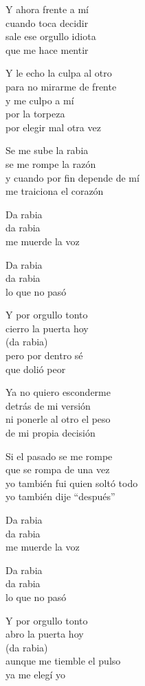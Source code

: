 \begin{lyrics}
Y ahora frente a mí\\
cuando toca decidir\\
sale ese orgullo idiota\\
que me hace mentir

Y le echo la culpa al otro\\
para no mirarme de frente\\
y me culpo a mí\\
por la torpeza\\
por elegir mal otra vez

Se me sube la rabia\\
se me rompe la razón\\
y cuando por fin depende de mí\\
me traiciona el corazón

Da rabia\\
da rabia\\
me muerde la voz

Da rabia\\
da rabia\\
lo que no pasó

Y por orgullo tonto\\
cierro la puerta hoy\\
(da rabia)\\
pero por dentro sé\\
que dolió peor

Ya no quiero esconderme\\
detrás de mi versión\\
ni ponerle al otro el peso\\
de mi propia decisión

Si el pasado se me rompe\\
que se rompa de una vez\\
yo también fui quien soltó todo\\
yo también dije “después”

Da rabia\\
da rabia\\
me muerde la voz

Da rabia\\
da rabia\\
lo que no pasó

Y por orgullo tonto\\
abro la puerta hoy\\
(da rabia)\\
aunque me tiemble el pulso\\
ya me elegí yo

\end{lyrics}

